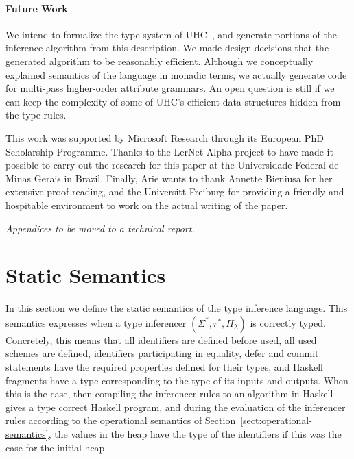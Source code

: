 \documentclass[preprint,natbib]{sigplanconf}
\newcommand\Rule{r}
\newcommand\Rules{\Rule^*}
\newcommand\Scheme{\Sigma}
\newcommand\Schemes{\Scheme^*}
\newcommand\Haskell{H_{\!\lambda}}
\begin{document}
  \paragraph{Future Work}
  We intend to formalize the type system of UHC~\cite{DBLP:conf/ifl/DijkstraFS07}, and generate portions of the inference algorithm
  from this description. We made design decisions that the generated algorithm to be reasonably efficient. Although we conceptually
  explained semantics of the language in monadic terms, we actually generate code for multi-pass higher-order attribute grammars.
  An open question is still if we can keep the complexity of some of UHC's efficient data structures hidden from the type rules.

\acks

This work was supported by Microsoft Research through its European PhD Scholarship Programme.
Thanks to the LerNet Alpha-project to have made it possible to carry out the research for
this paper at the Universidade Federal de Minas Gerais in Brazil.
Finally, Arie wants to thank Annette Bieniusa for her extensive proof reading, and the
Universitt Freiburg for providing a friendly and hospitable environment to work on
the actual writing of the paper.




\newpage
\appendix
{\it Appendices to be moved to a technical report.}

\section{Static Semantics}
\label{sect:static-semantics}

  In this section we define the static semantics of the type inference language. This semantics expresses
  when a type inferencer $(\Schemes,\Rules,\Haskell)$ is correctly typed. Concretely, this means that all
  identifiers are defined before used, all used schemes are defined, identifiers participating in equality,
  defer and commit statements have the required properties defined for their types, and Haskell fragments have a type
  corresponding to the type of its inputs and outputs. When this is the case, then compiling the inferencer
  rules to an algorithm in Haskell gives a type correct Haskell program, and during the evaluation of the
  inferencer rules according to the operational semantics of Section~\ref{sect:operational-semantics}, the
  values in the heap have the type of the identifiers if this was the case for the initial heap.
\end{document}
